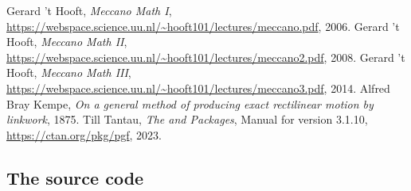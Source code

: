 \documentclass[a4paper,english,dvipsnames]{ltxdoc}
\begin{document}
\begin{thebibliography}{9}
Gerard 't Hooft,
\emph{Meccano Math I},\\
\url{https://webspace.science.uu.nl/~hooft101/lectures/meccano.pdf},
2006.
Gerard 't Hooft,
\emph{Meccano Math II},\\
\url{https://webspace.science.uu.nl/~hooft101/lectures/meccano2.pdf},
2008.
Gerard 't Hooft,
\emph{Meccano Math III},\\
\url{https://webspace.science.uu.nl/~hooft101/lectures/meccano3.pdf},
2014.
Alfred Bray Kempe,
\emph{On a general method of producing exact rectilinear motion by linkwork},
1875.
Till Tantau,
\emph{The \tikzname{} and {\upshape\pgfname} Packages},
Manual for version 3.1.10,
\url{https://ctan.org/pkg/pgf},
2023.
\end{thebibliography}
\printindex
{}
\pagestyle{plain}
\appendix
\begin{landscape}
\section{The source code}\label{Thesourcecode}
\end{landscape}
\end{document}
